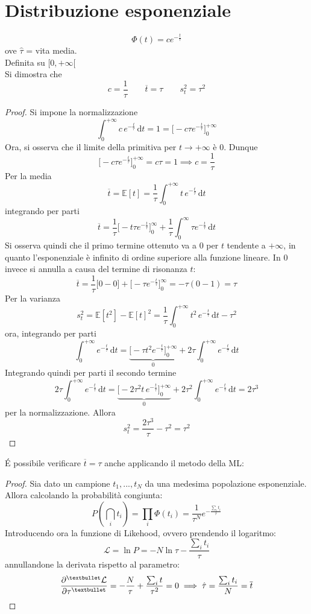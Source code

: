 \documentclass[10pt, oneside]{book}
\newcommand{\integral}[4]{\int_{#1}^{#2} #3 \, \mathrm{d}#4}
\begin{document}
\section{Distribuzione esponenziale}
\[\Phi(t) = c e^{\displaystyle - \frac{t}{\tau}}\]
ove $\hat{\tau}$ = vita media.\\
Definita su $[0, + \infty[$\\
Si dimostra che
\[c = \frac{1}{\tau} \qquad \overline{t} = \tau \qquad s_t^2 = \tau^2\]
\begin{proof}
Si impone la normalizzazione
\[\int_{0}^{+\infty} c \, e^{\displaystyle - \frac{t}{\tau}} \, \mathrm{d}t = 1 = \big[- c \tau e^{\displaystyle - \frac{t}{\tau}}\big]_{0}^{+\infty}\]
Ora, si osserva che il limite della primitiva per $t \rightarrow +\infty$ è $0$. Dunque
\[\big[- c \tau e^{\displaystyle - \frac{t}{\tau}}\big]_{0}^{+\infty} = c \tau = 1 \implies c = \frac{1}{\tau}\]
Per la media
\[\overline{t} = \mathbb{E}[t] = \frac{1}{\tau} \integral{0}{+\infty}{t \, e^{\displaystyle - \frac{t}{\tau}}}{t}\]
integrando per parti
\[\overline{t} = \frac{1}{\tau} \big[ - t \tau e^{\displaystyle - \frac{t}{\tau}} \big]_{0}^{\infty} + \frac{1}{\tau} \integral{0}{\infty}{\tau e^{\displaystyle - \frac{t}{\tau}}}{t}\]
Si osserva quindi che il primo termine ottenuto va a $0$ per $t$ tendente a $+\infty$, in quanto l'esponenziale è infinito di ordine superiore alla funzione lineare. In $0$ invece si annulla a causa del termine di risonanza $t$:
\[\overline{t} = \frac{1}{\tau}\big[0 - 0\big] + \big[ - \tau e^{\displaystyle - \frac{t}{\tau}} \big]_{0}^{\infty} = - \tau (0-1) = \tau\]
Per la varianza
\[s_t^2 = \mathbb{E}[t^2] - \mathbb{E}[t]^2 = \frac{1}{\tau} \integral{0}{+\infty}{t^2 \, e^{\displaystyle - \frac{t}{\tau}}}{t} - \tau^2\]
ora, integrando per parti
\[\integral{0}{+\infty}{e^{\displaystyle - \frac{t}{\tau}}}{t} = \underbrace{\big[ - \tau t^2 e^{\displaystyle - \frac{t}{\tau}} \big]_{0}^{+\infty}}_{0} + 2 \tau \integral{0}{+\infty}{e^{\displaystyle - \frac{t}{\tau}}}{t}\]
Integrando quindi per parti il secondo termine
\[2 \tau \integral{0}{+\infty}{e^{\displaystyle - \frac{t}{\tau}}}{t} = \underbrace{\big[ - 2 \tau^2 t \, e^{\displaystyle - \frac{t}{\tau}} \big]_{0}^{+\infty}}_{0} + 2 \tau^2 \integral{0}{+\infty}{e^{\displaystyle - \frac{t}{\tau}}}{t} = 2 \tau^3\]
per la normalizzazione. Allora
\[s_t^2 = \frac{2\tau^3}{\tau} - \tau^2 = \tau^2\]
\end{proof}

\'E possibile verificare $\overline{t} = \tau$ anche applicando il metodo della ML:
\begin{proof}
Sia dato un campione $t_1, ..., t_N$ da una medesima popolazione esponenziale. Allora calcolando la probabilità congiunta:
\[P(\bigcap_i t_i) = \prod_i \Phi(t_i) = \frac{1}{\tau^N} e^{\displaystyle - \frac{\sum_i t_i}{\tau}}\]
Introducendo ora la funzione di Likehood, ovvero prendendo il logaritmo:
\[\mathcal{L} = \ln P = - N \ln \tau - \frac{\sum_i t_i}{\tau}\]
annullandone la derivata rispetto al parametro:
\[\pdv[•]{\mathcal{L}}{\tau} = - \frac{N}{\tau} + \frac{\sum_i t}{\tau^2} = 0 \implies \hat{\tau} = \frac{\sum_i t_i}{N} = \overline{t}\]
\end{proof}
\end{document}
